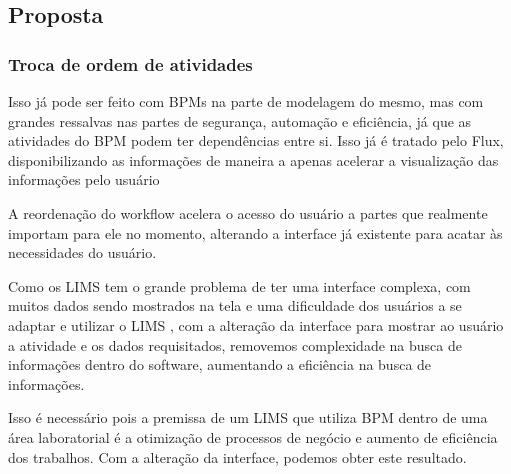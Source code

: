 \subsection{Proposta}

\subsubsection{Troca de ordem de atividades}




Isso já pode ser feito com BPMs na parte de modelagem do mesmo, mas com grandes ressalvas nas partes de segurança, automação e eficiência, já que as atividades do BPM podem ter dependências entre si. Isso já é tratado pelo Flux, disponibilizando as informações de maneira a apenas acelerar a visualização das informações pelo usuário


A reordenação do workflow acelera o acesso do usuário a partes que realmente importam para ele no momento, alterando a interface já existente para acatar às necessidades do usuário.


Como os LIMS tem o grande problema de ter uma interface complexa, com muitos dados sendo mostrados na tela e uma dificuldade dos usuários a se adaptar e utilizar o LIMS \R, com a alteração da interface para mostrar ao usuário a atividade e os dados requisitados, removemos complexidade na busca de informações dentro do software, aumentando a eficiência na busca de informações.


Isso é necessário pois a premissa de um LIMS que utiliza BPM dentro de uma área laboratorial é a otimização de processos de negócio e aumento de eficiência dos trabalhos. Com a alteração da interface, podemos obter este resultado.
